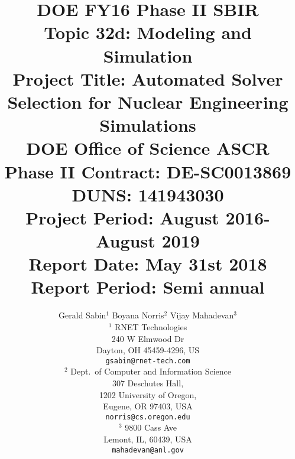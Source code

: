 \title{ 
       {\Large
       DOE FY16 Phase II SBIR\\
       Topic 32d: Modeling and Simulation\\
       Project Title: Automated Solver Selection for Nuclear Engineering Simulations\\
       \vspace{0.35in} 
       DOE Office of Science ASCR\\
       Phase II Contract: DE-SC0013869\\
       DUNS: 141943030\\
       Project Period: August 2016-August 2019 \\
       Report Date: May 31st 2018\\
       Report Period: Semi annual\\
       \vspace{0.35in}
       }
}
\author{Gerald Sabin$^1$  Boyana Norris$^2$ Vijay Mahadevan$^3$
  \vspace{0.15in}\\
  $^1$ RNET Technologies\\
  240 W Elmwood Dr\\
  Dayton, OH 45459-4296, US\\
{\tt {gsabin}@rnet-tech.com}
  \vspace{0.1in}\\
 $^2$ Dept.~of Computer and Information Science\\
  307 Deschutes Hall, \\
  1202 University of Oregon,\\
  Eugene, OR 97403, USA\\
  {\tt norris@cs.oregon.edu}
  \vspace{0.1in}\\
  $^3$ 9800 Cass Ave\\
   Lemont, IL, 60439, USA\\
  {\tt mahadevan@anl.gov}
}


